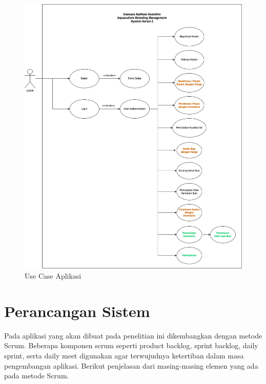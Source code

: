\begin{figure}[H]
	\centering
	\includegraphics[width=1\textwidth]{gambar/usecase_iterasi_2.png}
	\caption{Use Case Aplikasi}
\end{figure}

\section{Perancangan Sistem}

Pada aplikasi yang akan dibuat pada penelitian ini dikembangkan dengan metode Scrum. Beberapa komponen scrum seperti product backlog, sprint backlog, daily sprint, serta daily meet digunakan agar terwujudnya ketertiban dalam masa pengembangan aplikasi. Berikut penjelasan dari masing-masing elemen yang ada pada metode Scrum.

